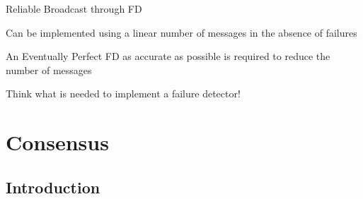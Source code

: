 % 
% 
% 
% 	
% 
% 	
% 
% 	
% 	
% 

\begin{frame}{Reliable Broadcast through FD}


\BIL
\item Can be implemented using a linear number of messages in the absence of failures
\item An Eventually Perfect FD as accurate as possible is required to reduce the number of messages
\EIL


\BIL
\item Think what is needed to implement a failure detector!
\EIL



% 

\end{frame}


\section{Consensus}

\subsection{Introduction}

